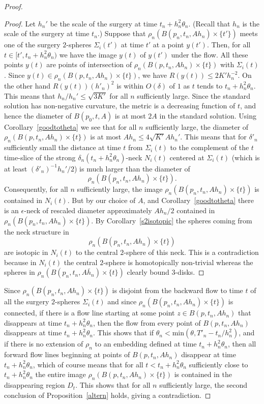 \begin{proof}
\begin{proof}
Let $h_n'$ be the scale of the surgery at time $t_n+ h_n^2\theta_n$.
(Recall that $h_n$ is the scale of the surgery at time $t_n$.)
Suppose that $\rho_n(B(p_n,t_n,Ah_n)\times \{t'\})$ meets one of the
surgery $2$-spheres $\Sigma_{i}(t')$ at time $t'$ at a point
$y(t')$. Then, for all $t\in [t',t_n+h_n^2\theta_n)$ we have
 the image $y(t)$ of $y(t')$ under the flow. All these points
$y(t)$ are points of intersection of $\rho_n(B(p,t_n,Ah_n)\times
\{t\})$ with $\Sigma_{i}(t)$. Since $y(t)\in \rho_n(B(p,t_n,A
h_n)\times\{t\})$, we have $ R(y(t))\le 2K' h_n^{-2}$. On the other
hand $R(y(t)) (h'_n)^2$ is within $O(\delta)$ of  $1$ as $t$ tends
to $t_n+h_n^2\theta_n$. This means that $h_n/h_n'\le \sqrt{3K'}$ for
all $n$ sufficiently large. Since the standard solution has
non-negative curvature, the metric is a decreasing function of $t$,
and hence the diameter of $B(p_0,t,A)$ is at most $ 2A$ in the standard
solution. Using Corollary~\ref{goodtotheta} we see that  for all $n$
sufficiently large, the diameter of $\rho_n\left(B(p,t_n,Ah_n)\times
\{t\}\right)$ is at most $Ah_n\le 4\sqrt{K'} Ah_n'$.
 This
means that for $\delta'_n$ sufficiently small the distance at time
$t$ from $\Sigma_{i}(t)$ to the complement of the $t$ time-slice
of the strong $\delta_n( t_n+ h_n^2\theta_n)$-neck $N_{i}(t)$
centered at $\Sigma_{i}(t)$ (which is at least
$(\delta'_n)^{-1}h_n'/2$) is much larger than the diameter of
$$\rho_n(B(p_n,t_n,Ah_n)\times \{t\}).$$  Consequently,  for all $n$
sufficiently large, the image $\rho_n(B(p_n,t_n,Ah_n)\times \{t\})$
is contained in  $N_{i}(t)$. But by our choice of $A$, and
Corollary~\ref{goodtotheta} there is an $\epsilon$-neck of rescaled
diameter approximately $Ah_n/2$ contained in $\rho_n(B(p_n,t_n,A
h_n)\times \{t\})$. By Corollary~\ref{s2isotopic} the spheres coming
from the neck structure in $$\rho_n(B(p_n,t_n,Ah_n)\times \{t\})$$ are
 isotopic in $N_{i}(t)$ to the central $2$-sphere of this neck.
This is a contradiction because in $N_{i}(t)$ the central
$2$-sphere is homotopically non-trivial whereas  the spheres in
$\rho_n(B(p_n,t_n,A\bar h_n)\times \{t\})$  clearly bound
$3$-disks.
\end{proof}

Since $\rho_n(B(p_n,t_n,Ah_n)\times\{t\})$ is disjoint from the
backward flow to time $t$ of all the surgery $2$-spheres
$\Sigma_{i}(t)$ and since $\rho_n(B(p_n,t_n,Ah_n)\times \{t\})$ is
connected,
 if there is a flow line starting at some point $z\in
B(p,t_n,Ah_n)$ that disappears at time $t_n+ h_n^2\theta_n$, then
the flow from every point of $B(p,t_n,Ah_n)$ disappears at time $
t_n+ h_n^2\theta_n$. This shows that if $\theta_n<\mathrm{min}(\theta,T'_n- t_n/h_n^{2})$, and if there is no extension of
$\rho_n$ to an embedding defined at time $t_n+h^2_n\theta_n$, then
all forward flow lines beginning at points of $B(p,t_n,A h_n)$
disappear at time $ t_n+h_n^2\theta_n$, which of course means that
for all $t<t_n+h^2_n\theta_n$ sufficiently close to
$t_n+h_n^2\theta_n$ the entire image $\rho_n(B(p,t_n,Ah_n)\times
\{t\})$ is contained in the disappearing region $D_t$. This shows
that for all $n$ sufficiently large, the second conclusion of
Proposition~\ref{altern} holds,  giving a contradiction.


\end{proof}
